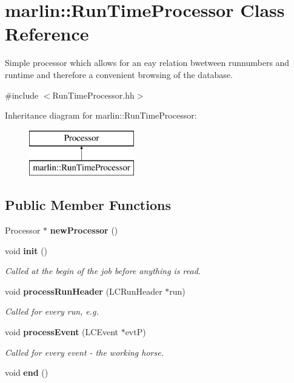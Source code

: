 \section{marlin\-:\-:Run\-Time\-Processor Class Reference}
\label{classmarlin_1_1RunTimeProcessor}


Simple processor which allows for an eay relation bwetween runnumbers and runtime and therefore a convenient browsing of the database.  




{\ttfamily \#include $<$Run\-Time\-Processor.\-hh$>$}

Inheritance diagram for marlin\-:\-:Run\-Time\-Processor\-:\begin{figure}[H]
\begin{center}
\leavevmode
\includegraphics[height=2.000000cm]{classmarlin_1_1RunTimeProcessor}
\end{center}
\end{figure}
\subsection*{Public Member Functions}
\begin{DoxyCompactItemize}
\item 
Processor $\ast$ {\bfseries new\-Processor} ()\label{classmarlin_1_1RunTimeProcessor_abb4e168d5fbedd389700c6a49d3cda16}

\item 
void {\bf init} ()
\begin{DoxyCompactList}\small\item\em Called at the begin of the job before anything is read. \end{DoxyCompactList}\item 
void {\bf process\-Run\-Header} (L\-C\-Run\-Header $\ast$run)
\begin{DoxyCompactList}\small\item\em Called for every run, e.\-g. \end{DoxyCompactList}\item 
void {\bf process\-Event} (L\-C\-Event $\ast$evt\-P)
\begin{DoxyCompactList}\small\item\em Called for every event -\/ the working horse. \end{DoxyCompactList}\item 
void {\bfseries end} ()\label{classmarlin_1_1RunTimeProcessor_a67b683b9715712a534b86e365f551e5b}

\end{DoxyCompactItemize}
